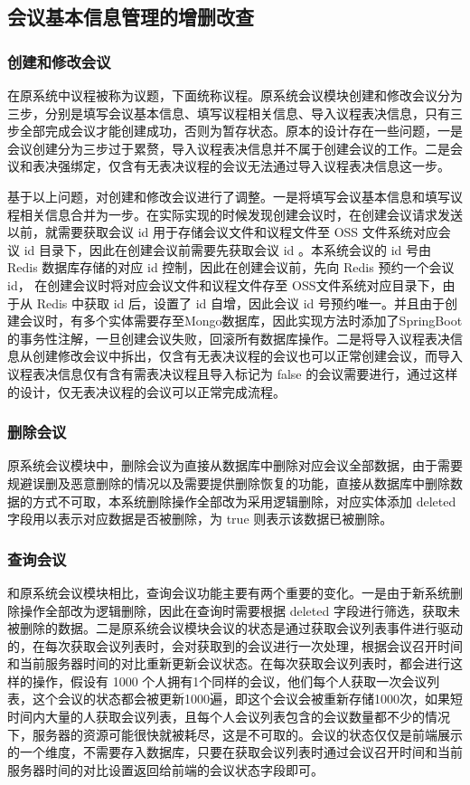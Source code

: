 \subsection{会议基本信息管理的增删改查}
\subsubsection{创建和修改会议}
在原系统中议程被称为议题，下面统称议程。原系统会议模块创建和修改会议分为三步，分别是填写会议基本信息、填写议程相关信息、导入议程表决信息，只有三步全部完成会议才能创建成功，否则为暂存状态。原本的设计存在一些问题，一是会议创建分为三步过于累赘，导入议程表决信息并不属于创建会议的工作。二是会议和表决强绑定，仅含有无表决议程的会议无法通过导入议程表决信息这一步。

基于以上问题，对创建和修改会议进行了调整。一是将填写会议基本信息和填写议程相关信息合并为一步。在实际实现的时候发现创建会议时，在创建会议请求发送以前，就需要获取会议 id 用于存储会议文件和议程文件至 OSS 文件系统对应会议 id 目录下，因此在创建会议前需要先获取会议 id 。本系统会议的 id 号由 Redis 数据库存储的对应 id 控制，因此在创建会议前，先向 Redis 预约一个会议 id， 在创建会议时将对应会议文件和议程文件存至 OSS文件系统对应目录下，由于从 Redis 中获取 id 后，设置了 id 自增，因此会议 id 号预约唯一。并且由于创建会议时，有多个实体需要存至Mongo数据库，因此实现方法时添加了SpringBoot 的事务性注解，一旦创建会议失败，回滚所有数据库操作。二是将导入议程表决信息从创建修改会议中拆出，仅含有无表决议程的会议也可以正常创建会议，而导入议程表决信息仅有含有需表决议程且导入标记为 false 的会议需要进行，通过这样的设计，仅无表决议程的会议可以正常完成流程。

\subsubsection{删除会议}
原系统会议模块中，删除会议为直接从数据库中删除对应会议全部数据，由于需要规避误删及恶意删除的情况以及需要提供删除恢复的功能，直接从数据库中删除数据的方式不可取，本系统删除操作全部改为采用逻辑删除，对应实体添加 deleted 字段用以表示对应数据是否被删除，为 true 则表示该数据已被删除。

\subsubsection{查询会议}
和原系统会议模块相比，查询会议功能主要有两个重要的变化。一是由于新系统删除操作全部改为逻辑删除，因此在查询时需要根据 deleted 字段进行筛选，获取未被删除的数据。二是原系统会议模块会议的状态是通过获取会议列表事件进行驱动的，在每次获取会议列表时，会对获取到的会议进行一次处理，根据会议召开时间和当前服务器时间的对比重新更新会议状态。在每次获取会议列表时，都会进行这样的操作，假设有 1000 个人拥有1个同样的会议，他们每个人获取一次会议列表，这个会议的状态都会被更新1000遍，即这个会议会被重新存储1000次，如果短时间内大量的人获取会议列表，且每个人会议列表包含的会议数量都不少的情况下，服务器的资源可能很快就被耗尽，这是不可取的。会议的状态仅仅是前端展示的一个维度，不需要存入数据库，只要在获取会议列表时通过会议召开时间和当前服务器时间的对比设置返回给前端的会议状态字段即可。

